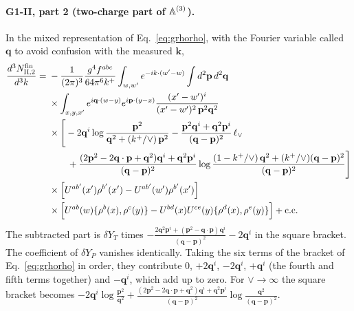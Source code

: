 \paragraph*{G1-II, part 2 (two-charge part of $\mathbb{A}^{(3)}$).} In the mixed representation of Eq.~\eqref{eq:grhorho}, with the Fourier variable called $\mathbf q$ to avoid confusion with the measured $\mathbf k$,
\begin{align}
\frac{d^3N^{\rm fin}_{\rm II,2}}{d^3k}={}&-\frac{1}{(2\pi)^3}\frac{g^4f^{abc}}{64\pi^6k^+}\int_{w,w'}e^{-ik\cdot(w'-w)}\int d^2\mathbf p\,d^2\mathbf q\notag\\
&\times\int_{x,y,x'}e^{i\mathbf q\cdot(w-y)}e^{i\mathbf p\cdot(y-x)}\frac{(x'-w')^i}{(x'-w')^2\,\mathbf p^2\mathbf q^2}\notag\\
&\times\Bigg[-2\mathbf q^i\log\frac{\mathbf p^2}{\mathbf q^2+(k^+/\vee)\,\mathbf p^2}-\frac{\mathbf p^2\mathbf q^i+\mathbf q^2\mathbf p^i}{(\mathbf q-\mathbf p)^2}\,\ell_{\vee}\notag\\
&\qquad+\frac{(2\mathbf p^2-2\mathbf q\cdot\mathbf p+\mathbf q^2)\mathbf q^i+\mathbf q^2\mathbf p^i}{(\mathbf q-\mathbf p)^2}\log\frac{(1-k^+/\vee)\,\mathbf q^2+(k^+/\vee)(\mathbf q-\mathbf p)^2}{(\mathbf q-\mathbf p)^2}\Bigg]\notag\\
&\times\Big[U^{ab'}(x')\rho^{b'}(x')-U^{ab'}(w')\rho^{b'}(x')\Big]\notag\\
&\times\Big[U^{ab}(w)\{\rho^b(x),\rho^c(y)\}-U^{bd}(x)U^{ce}(y)\{\rho^d(x),\rho^e(y)\}\Big]+{\rm c.c.}
\label{eq:finII2}
\end{align}
The subtracted part is $\delta Y_T$ times $-\frac{2\mathbf q^2\mathbf p^i+(\mathbf p^2-\mathbf q\cdot\mathbf p)\mathbf q^i}{(\mathbf q-\mathbf p)^2}-2\mathbf q^i$ in the square bracket. The coefficient of $\delta Y_P$ vanishes identically. Taking the six terms of the bracket of Eq.~\eqref{eq:grhorho} in order, they contribute $0$, $+2\mathbf q^i$, $-2\mathbf q^i$, $+\mathbf q^i$ (the fourth and fifth terms together) and $-\mathbf q^i$, which add up to zero. For $\vee\to\infty$ the square bracket becomes $-2\mathbf q^i\log\frac{\mathbf p^2}{\mathbf q^2}+\frac{(2\mathbf p^2-2\mathbf q\cdot\mathbf p+\mathbf q^2)\mathbf q^i+\mathbf q^2\mathbf p^i}{(\mathbf q-\mathbf p)^2}\log\frac{\mathbf q^2}{(\mathbf q-\mathbf p)^2}$.

